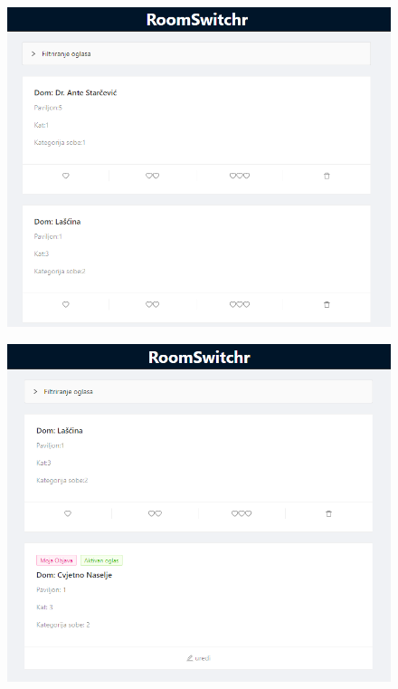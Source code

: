 			\begin{figure}[H]
				\includegraphics[scale=0.6]{slike/test11.PNG} %
				\centering
				\label{fig:test11}
			\end{figure}
			\begin{figure}[H]
				\includegraphics[scale=0.6]{slike/test11pom.PNG} %
				\centering
				\label{fig:test11pom}
			\end{figure}
			
